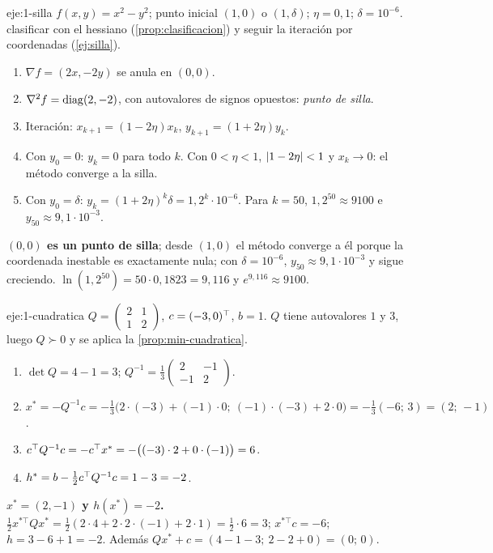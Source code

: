 \begin{solucion}{eje:1-silla}
\datos $f(x,y)=x^{2}-y^{2}$; punto inicial $(1,0)$ o $(1,\delta)$; $\eta=0{,}1$; $\delta=10^{-6}$.
\planteamiento clasificar con el hessiano (\cref{prop:clasificacion}) y seguir la iteración por coordenadas (\cref{ej:silla}).
\pasos
\begin{enumerate}[label=\arabic*.]
  \item $\nabla f=(2x,-2y)$ se anula en $(0,0)$.
  \item $\nabla^{2}f=\operatorname{diag}(2,-2)$, con autovalores de signos opuestos: \emph{punto de silla}.
  \item Iteración: $x_{k+1}=(1-2\eta)x_k$, $y_{k+1}=(1+2\eta)y_k$.
  \item Con $y_0=0$: $y_k=0$ para todo $k$. Con $0<\eta<1$, $\lvert1-2\eta\rvert<1$ y $x_k\to 0$: el método converge a la silla.
  \item Con $y_0=\delta$: $y_k=(1+2\eta)^{k}\delta=1{,}2^{k}\cdot 10^{-6}$. Para $k=50$, $1{,}2^{50}\approx 9100$ e $y_{50}\approx 9{,}1\cdot 10^{-3}$.
\end{enumerate}
\resultado \textbf{$(0,0)$ es un punto de silla}; desde $(1,0)$ el método converge a él porque la coordenada inestable es exactamente nula; con $\delta=10^{-6}$, $y_{50}\approx 9{,}1\cdot 10^{-3}$ y sigue creciendo.
\comprobacion $\ln(1{,}2^{50})=50\cdot 0{,}1823=9{,}116$ y $e^{9{,}116}\approx 9100$.
\end{solucion}

\begin{solucion}{eje:1-cuadratica}
\datos $Q=\begin{pmatrix}2&1\\1&2\end{pmatrix}$, $c=(-3,0)^{\top}$, $b=1$.
\planteamiento $Q$ tiene autovalores $1$ y $3$, luego $Q\succ 0$ y se aplica la \cref{prop:min-cuadratica}.
\pasos
\begin{enumerate}[label=\arabic*.]
  \item $\det Q=4-1=3$; $Q^{-1}=\frac13\begin{pmatrix}2&-1\\-1&2\end{pmatrix}$.
  \item $x^{\ast}=-Q^{-1}c=-\frac13\bigl(2\cdot(-3)+(-1)\cdot 0;\ (-1)\cdot(-3)+2\cdot 0\bigr)=-\frac13(-6;\,3)=(2;\,-1)$.
  \item $c^{\top} Q^{-1}c=-c^{\top} x^{\ast}=-\bigl((-3)\cdot 2+0\cdot(-1)\bigr)=6$.
  \item $h^{\ast}=b-\frac12c^{\top} Q^{-1}c=1-3=-2$.
\end{enumerate}
\resultado \textbf{$x^{\ast}=(2,-1)$ y $h(x^{\ast})=-2$.}
\comprobacion $\frac12x^{\ast\top}Qx^{\ast}=\frac12(2\cdot 4+2\cdot 2\cdot(-1)+2\cdot 1)=\frac12\cdot 6=3$; $x^{\ast\top}c=-6$; $h=3-6+1=-2$. Además $Qx^{\ast}+c=(4-1-3;\ 2-2+0)=(0;\,0)$.
\end{solucion}

